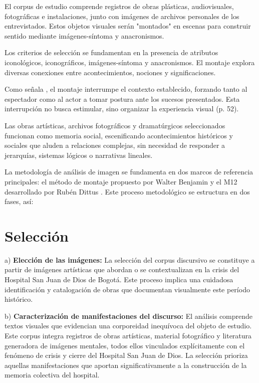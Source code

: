 El corpus de estudio comprende registros de obras plásticas, audiovisuales, fotográficas e instalaciones, junto con imágenes de archivos personales de los entrevistados. Estos objetos visuales serán "montados" en escenas para construir sentido mediante imágenes-síntoma y anacronismos.

Los criterios de selección se fundamentan en la presencia de atributos iconológicos, iconográficos, imágenes-síntoma y anacronismos. El montaje explora diversas conexiones entre acontecimientos, nociones y significaciones.

Como señala \parencite{Benjamin2004}, el montaje interrumpe el contexto establecido, forzando tanto al espectador como al actor a tomar postura ante los sucesos presentados. Esta interrupción no busca estimular, sino organizar la experiencia visual (p. 52).

Las obras artísticas, archivos fotográficos y dramatúrgicos seleccionados funcionan como memoria social, escenificando acontecimientos históricos y sociales que aluden a relaciones complejas, sin necesidad de responder a jerarquías, sistemas lógicos o narrativas lineales.

La metodología de análisis de imagen se fundamenta en dos marcos de referencia principales: el método de montaje propuesto por Walter Benjamin \parencite{BuckMorss1989} y el M12 desarrollado por Rubén Dittus \parencite{Aliaga2022}. Este proceso metodológico se estructura en dos fases, así:

\section{Selección}

a) \textbf{Elección de las imágenes:} La selección del corpus discursivo se constituye a partir de imágenes artísticas que abordan o se contextualizan en la crisis del Hospital San Juan de Dios de Bogotá. Este proceso implica una cuidadosa identificación y catalogación de obras que documentan visualmente este período histórico.

b) \textbf{Caracterización de manifestaciones del discurso:} El análisis comprende textos visuales que evidencian una corporeidad inequívoca del objeto de estudio. Este corpus integra registros de obras artísticas, material fotográfico y literatura generadora de imágenes mentales, todos ellos vinculados explícitamente con el fenómeno de crisis y cierre del Hospital San Juan de Dios. La selección prioriza aquellas manifestaciones que aportan significativamente a la construcción de la memoria colectiva del hospital.

